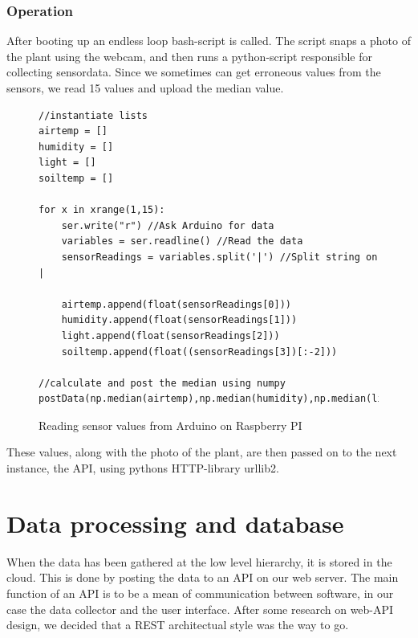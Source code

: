 \subsubsection{Operation}
After booting up an endless loop bash-script is called. The script snaps a photo of the plant using the webcam, and then runs a python-script responsible for collecting sensordata. Since we sometimes can get erroneous values from the sensors, we read 15 values and upload the median value.

\lstset{language=Python} 
\begin{figure}
\begin{lstlisting}
//instantiate lists
airtemp = []
humidity = []
light = []
soiltemp = [] 

for x in xrange(1,15): 
	ser.write("r") //Ask Arduino for data
	variables = ser.readline() //Read the data
	sensorReadings = variables.split('|') //Split string on |

	airtemp.append(float(sensorReadings[0]))
	humidity.append(float(sensorReadings[1]))
	light.append(float(sensorReadings[2]))
	soiltemp.append(float((sensorReadings[3])[:-2])) 

//calculate and post the median using numpy
postData(np.median(airtemp),np.median(humidity),np.median(light),np.median(soiltemp)) 
\end{lstlisting}
\caption{Reading sensor values from Arduino on Raspberry PI}
\label{fig:raspberrycode}
\end{figure}

These values, along with the photo of the plant, are then passed on to the next instance, the API, using pythons HTTP-library urllib2. 

\section{Data processing and database}
When the data has been gathered at the low level hierarchy, it is stored in the cloud. This is done by posting the data to an API on our web server. The main function of an API is to be a mean of communication between software, in our case the data collector and the user interface. After some research on web-API design, we decided that a REST architectual style was the way to go. 

